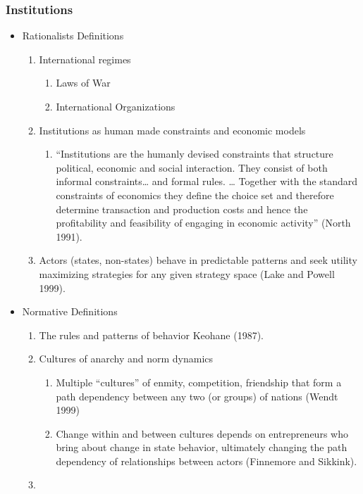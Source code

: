 \documentclass[11pt]{article}
\begin{document}
\subsubsection{Institutions}
\label{sec-1-1-5}
\begin{itemize}
\item Rationalists Definitions
\label{sec-1-1-5-1}
\begin{enumerate}
\item International regimes
\begin{enumerate}
\item Laws of War
\item International Organizations
\end{enumerate}
\item Institutions as human made constraints and economic models
\begin{enumerate}
\item ``Institutions are the humanly devised constraints that structure
political, economic and social interaction. They consist of both
informal constraints\ldots{} and formal rules. \ldots{} Together with the
standard constraints of economics they define the choice set and
therefore determine transaction and production costs and hence
the profitability and feasibility of engaging in economic
activity'' (North 1991).
\end{enumerate}
\item Actors (states, non-states) behave in predictable patterns and seek
utility maximizing strategies for any given strategy space (Lake
and Powell 1999).
\end{enumerate}


\item Normative Definitions
\label{sec-1-1-5-2}
\begin{enumerate}
\item The rules and patterns of behavior Keohane (1987).
\item Cultures of anarchy and norm dynamics
\begin{enumerate}
\item Multiple ``cultures'' of enmity, competition, friendship that form
a path dependency between any two (or groups) of nations (Wendt 1999)
\item Change within and between cultures depends on entrepreneurs who
bring about change in state behavior, ultimately changing the
path dependency of relationships between actors (Finnemore and Sikkink).
\end{enumerate}
\item 
\end{enumerate}
\end{itemize}
\end{document}
